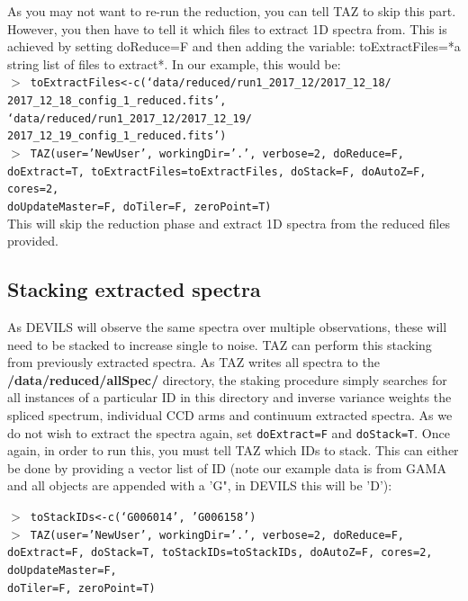 \documentclass[12pt]{article}
\begin{document}
As you may not want to re-run the reduction, you can tell TAZ to skip this part. However, you then have to tell it which files to extract 1D spectra from. This is achieved by setting  doReduce=F and then adding the variable: toExtractFiles=*a string list of files to extract*. In our example, this would be:\\

 \hspace{10mm} \texttt{$>$ toExtractFiles<-c(`data/reduced/run1\_2017\_12/2017\_12\_18/ \\ 2017\_12\_18\_config\_1\_reduced.fits', `data/reduced/run1\_2017\_12/2017\_12\_19/ \\ 2017\_12\_19\_config\_1\_reduced.fits')}\\
 
  \hspace{10mm} \texttt{$>$ TAZ(user='NewUser', workingDir='.', verbose=2, doReduce=F, doExtract=T, toExtractFiles=toExtractFiles, doStack=F, doAutoZ=F, cores=2, \\ doUpdateMaster=F, doTiler=F, zeroPoint=T)}\\

 This will skip the reduction phase and extract 1D spectra from the reduced files provided.
 
 \subsection{Stacking extracted spectra}
 
 As DEVILS will observe the same spectra over multiple observations, these will need to be stacked to increase single to noise. TAZ can perform this stacking from previously extracted spectra. As TAZ writes all spectra to the \textbf{/data/reduced/allSpec/} directory, the staking procedure simply searches for all instances of a particular ID in this directory and inverse variance weights the spliced spectrum, individual CCD arms and continuum extracted spectra. As we do not wish to extract the spectra again, set \texttt{doExtract=F} and \texttt{doStack=T}. Once again, in order to run this, you must tell TAZ which IDs to stack. This can either be done by providing a vector list of ID (note our example data is from GAMA and all objects are appended with a 'G", in DEVILS this will be 'D'):
 
   \hspace{10mm} \texttt{$>$ toStackIDs<-c(`G006014', 'G006158')}\\
 
  \hspace{10mm} \texttt{$>$ TAZ(user='NewUser', workingDir='.', verbose=2, doReduce=F, doExtract=F, doStack=T,  toStackIDs=toStackIDs, doAutoZ=F, cores=2, doUpdateMaster=F, \\ doTiler=F, zeroPoint=T)}\\ 
  
\end{document}
